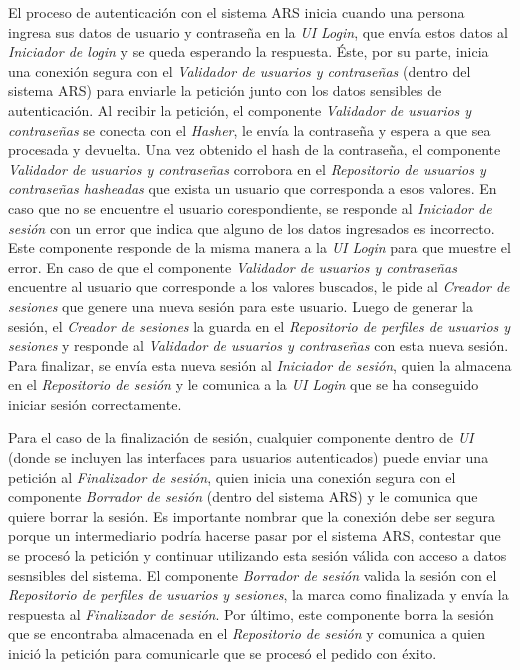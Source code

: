 \par El proceso de autenticación con el sistema ARS inicia cuando una persona ingresa sus datos de usuario y contraseña en la \textit{UI Login}, que envía estos datos al \textit{Iniciador de login} y se queda esperando la respuesta. Éste, por su parte, inicia una conexión segura con el \textit{Validador de usuarios y contraseñas} (dentro del sistema ARS) para enviarle la petición junto con los datos sensibles de autenticación. Al recibir la petición, el componente \textit{Validador de usuarios y contraseñas} se conecta con el \textit{Hasher}, le envía la contraseña y espera a que sea procesada y devuelta. Una vez obtenido el hash de la contraseña, el componente \textit{Validador de usuarios y contraseñas} corrobora en el \textit{Repositorio de usuarios y contraseñas hasheadas} que exista un usuario que corresponda a esos valores. En caso que no se encuentre el usuario corespondiente, se responde al \textit{Iniciador de sesión} con un error que indica que alguno de los datos ingresados es incorrecto. Este componente responde de la misma manera a la \textit{UI Login} para que muestre el error. En caso de que el componente \textit{Validador de usuarios y contraseñas} encuentre al usuario que corresponde a los valores buscados, le pide al \textit{Creador de sesiones} que genere una nueva sesión para este usuario. Luego de generar la sesión, el \textit{Creador de sesiones} la guarda en el \textit{Repositorio de perfiles de usuarios y sesiones} y responde al \textit{Validador de usuarios y contraseñas} con esta nueva sesión. Para finalizar, se envía esta nueva sesión al \textit{Iniciador de sesión}, quien la almacena en el \textit{Repositorio de sesión} y le comunica a la \textit{UI Login} que se ha conseguido iniciar sesión correctamente.

\par Para el caso de la finalización de sesión, cualquier componente dentro de \textit{UI} (donde se incluyen las interfaces para usuarios autenticados) puede enviar una petición al \textit{Finalizador de sesión}, quien inicia una conexión segura con el componente \textit{Borrador de sesión} (dentro del sistema ARS) y le comunica que quiere borrar la sesión. Es importante nombrar que la conexión debe ser segura porque un intermediario podría hacerse pasar por el sistema ARS, contestar que se procesó la petición y continuar utilizando esta sesión válida con acceso a datos sesnsibles del sistema. El componente \textit{Borrador de sesión} valida la sesión con el \textit{Repositorio de perfiles de usuarios y sesiones}, la marca como finalizada y envía la respuesta al \textit{Finalizador de sesión}. Por último, este componente borra la sesión que se encontraba almacenada en el \textit{Repositorio de sesión} y comunica a quien inició la petición para comunicarle que se procesó el pedido con éxito.

